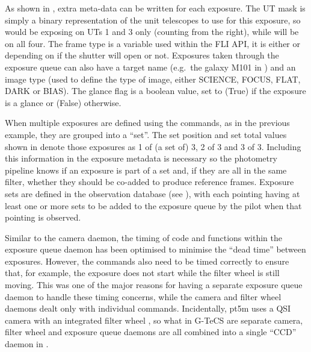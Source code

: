 \begin{colsection}
As shown in , extra meta-data can be written for each exposure. The UT mask is simply a binary representation of the unit telescopes to use for this exposure, so  would be exposing on UTs 1 and 3 only (counting from the right), while  will be on all four. The frame type is a variable used within the FLI API, it is either  or  depending on if the shutter will open or not. Exposures taken through the exposure queue can also have a target name (e.g.\ the galaxy M101 in ) and an image type (used to define the type of image, either SCIENCE, FOCUS, FLAT, DARK or BIAS). The glance flag is a boolean value, set to  (True) if the exposure is a glance or  (False) otherwise.

When multiple exposures are defined using the  commands, as in the previous  example, they are grouped into a ``set''. The set position and set total values shown in  denote those exposures as 1 of (a set of) 3, 2 of 3 and 3 of 3. Including this information in the exposure metadata is necessary so the photometry pipeline knows if an exposure is part of a set and, if they are all in the same filter, whether they should be co-added to produce reference frames. Exposure sets are defined in the observation database (see ), with each pointing having at least one or more sets to be added to the exposure queue by the pilot when that pointing is observed.

Similar to the camera daemon, the timing of code and functions within the exposure queue daemon has been optimised to minimise the ``dead time'' between exposures. However, the commands also need to be timed correctly to ensure that, for example, the exposure does not start while the filter wheel is still moving. This was one of the major reasons for having a separate exposure queue daemon to handle these timing concerns, while the camera and filter wheel daemons dealt only with individual commands. Incidentally, pt5m uses a QSI camera with an integrated filter wheel \citep{pt5m}, so what in G-TeCS are separate camera, filter wheel and exposure queue daemons are all combined into a single ``CCD'' daemon in .

\end{colsection}


